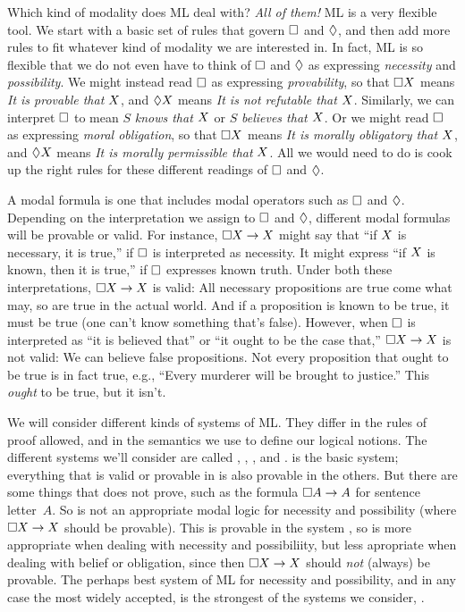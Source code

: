 Which kind of modality does ML deal with? \emph{All of them!} ML is a very flexible tool. We start with a basic set of rules that govern $\Box$ and $\Diamond$, and then add more rules to fit whatever kind of modality we are interested in. In fact, ML is so flexible that we do not even have to think of $\Box$ and $\Diamond$ as expressing \emph{necessity} and \emph{possibility}. We might instead read $\Box$ as expressing \emph{provability}, so that $\Box X$ means \emph{It is provable that} $X$, and $\Diamond X$ means \emph{It is not refutable that} $X$. Similarly, we can interpret $\Box$ to mean $S$ \emph{knows that $X$} or $S$ \emph{believes that $X$}. Or we might read $\Box$ as expressing \emph{moral obligation}, so that $\Box X$ means \emph{It is morally obligatory that} $X$, and $\Diamond X$ means \emph{It is morally permissible that} $X$. All we would need to do is cook up the right rules for these different readings of $\Box$ and $\Diamond$.

A modal formula is one that includes modal operators such as $\Box$ and $\Diamond$. Depending on the interpretation we assign to $\Box$ and $\Diamond$, different modal formulas will be provable or valid. For instance, $\Box X \rightarrow X$ might say that ``if $X$ is necessary, it is true,'' if $\Box$ is interpreted as necessity. It might express ``if $X$ is known, then it is true,'' if $\Box$ expresses known truth. Under both these interpretations, $\Box X \rightarrow X$ is valid: All necessary propositions are true come what may, so are true in the actual world. And if a proposition is known to be true, it must be true (one can't know something that's false). However, when $\Box$ is interpreted as ``it is believed that'' or ``it ought to be the case that,'' $\Box X \rightarrow X$ is not valid: We can believe false propositions. Not every proposition that ought to be true is in fact true, e.g., ``Every murderer will be brought to justice.'' This \emph{ought} to be true, but it isn't. 

We will consider different kinds of systems of ML. They differ in the rules of proof allowed, and in the semantics we use to define our logical notions. The different systems we'll consider are called \mlK, \mlT, \mlSfour, and \mlSfive. \mlK{} is the basic system; everything that is valid or provable in \mlK{} is also provable in the others. But there are some things that \mlK{} does not prove, such as the formula $\Box A \rightarrow A$ for sentence letter~$A$. So \mlK{} is not an appropriate modal logic for necessity and possibility (where $\Box X \rightarrow X$ should be provable). This is provable in the system \mlT, so \mlT{} is more appropriate when dealing with necessity and possibiliity, but less apropriate when dealing with belief or obligation, since then $\Box X \rightarrow X$ should \emph{not} (always) be provable. The perhaps best system of ML for necessity and possibility, and in any case the most widely accepted, is the strongest of the systems we consider, \mlSfive.

